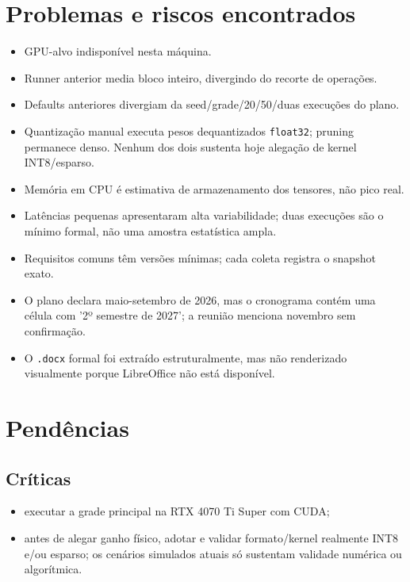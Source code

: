 \section{Problemas e riscos encontrados}


\begin{itemize}
\item GPU-alvo indisponível nesta máquina.
\item Runner anterior media bloco inteiro, divergindo do recorte de operações.
\item Defaults anteriores divergiam da seed/grade/20/50/duas execuções do plano.
\item Quantização manual executa pesos dequantizados \texttt{float32}; pruning permanece
denso. Nenhum dos dois sustenta hoje alegação de kernel INT8/esparso.
\item Memória em CPU é estimativa de armazenamento dos tensores, não pico real.
\item Latências pequenas apresentaram alta variabilidade; duas execuções são o
mínimo formal, não uma amostra estatística ampla.
\item Requisitos comuns têm versões mínimas; cada coleta registra o snapshot exato.
\item O plano declara maio-setembro de 2026, mas o cronograma contém uma célula com
'2º semestre de 2027'; a reunião menciona novembro sem confirmação.
\item O \texttt{.\allowbreak{}docx} formal foi extraído estruturalmente, mas não renderizado visualmente
porque LibreOffice não está disponível.
\end{itemize}


\section{Pendências}



\subsection{Críticas}


\begin{itemize}
\item executar a grade principal na RTX 4070 Ti Super com CUDA;
\item antes de alegar ganho físico, adotar e validar formato/kernel realmente INT8
e/ou esparso; os cenários simulados atuais só sustentam validade numérica ou
algorítmica.
\end{itemize}


